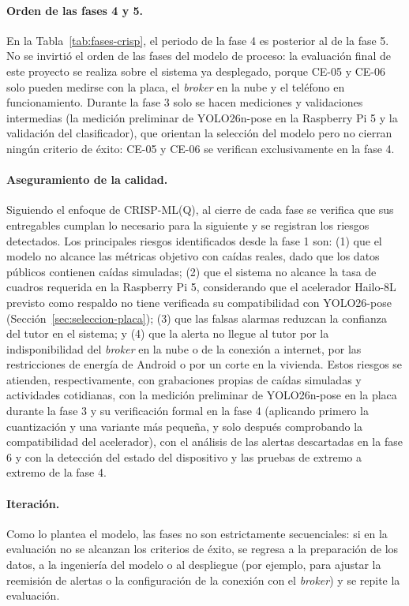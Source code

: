 \documentclass[12pt,a4paper,oneside]{book}
\theoremstyle{plain}
\theoremstyle{definition}
\theoremstyle{remark}
\begin{document}
\paragraph{Orden de las fases 4 y 5.} En la Tabla~\ref{tab:fases-crisp}, el periodo de la fase 4 es posterior al de la fase 5. No se invirtió el orden de las fases del modelo de proceso: la evaluación final de este proyecto se realiza sobre el sistema ya desplegado, porque CE-05 y CE-06 solo pueden medirse con la placa, el \textit{broker} en la nube y el teléfono en funcionamiento. Durante la fase 3 solo se hacen mediciones y validaciones intermedias (la medición preliminar de YOLO26n-pose en la Raspberry Pi 5 y la validación del clasificador), que orientan la selección del modelo pero no cierran ningún criterio de éxito: CE-05 y CE-06 se verifican exclusivamente en la fase 4.

\paragraph{Aseguramiento de la calidad.} Siguiendo el enfoque de CRISP-ML(Q), al cierre de cada fase se verifica que sus entregables cumplan lo necesario para la siguiente y se registran los riesgos detectados. Los principales riesgos identificados desde la fase 1 son: (1) que el modelo no alcance las métricas objetivo con caídas reales, dado que los datos públicos contienen caídas simuladas; (2) que el sistema no alcance la tasa de cuadros requerida en la Raspberry Pi 5, considerando que el acelerador Hailo-8L previsto como respaldo no tiene verificada su compatibilidad con YOLO26-pose (Sección~\ref{sec:seleccion-placa}); (3) que las falsas alarmas reduzcan la confianza del tutor en el sistema; y (4) que la alerta no llegue al tutor por la indisponibilidad del \textit{broker} en la nube o de la conexión a internet, por las restricciones de energía de Android o por un corte en la vivienda. Estos riesgos se atienden, respectivamente, con grabaciones propias de caídas simuladas y actividades cotidianas, con la medición preliminar de YOLO26n-pose en la placa durante la fase 3 y su verificación formal en la fase 4 (aplicando primero la cuantización y una variante más pequeña, y solo después comprobando la compatibilidad del acelerador), con el análisis de las alertas descartadas en la fase 6 y con la detección del estado del dispositivo y las pruebas de extremo a extremo de la fase 4.

\paragraph{Iteración.} Como lo plantea el modelo, las fases no son estrictamente secuenciales: si en la evaluación no se alcanzan los criterios de éxito, se regresa a la preparación de los datos, a la ingeniería del modelo o al despliegue (por ejemplo, para ajustar la reemisión de alertas o la configuración de la conexión con el \textit{broker}) y se repite la evaluación.
\end{document}
